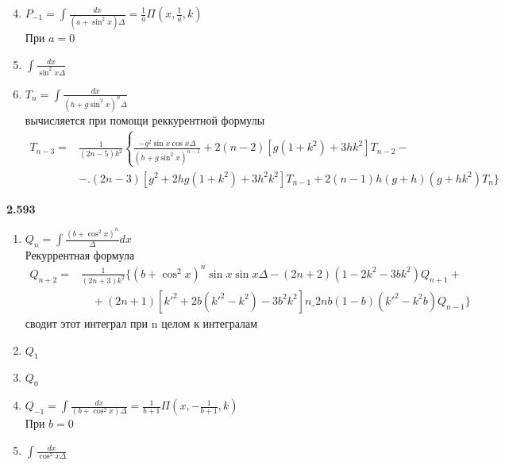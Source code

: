 \documentclass[a4paper,10pt]{article}
\begin{document}
\begin{enumerate}
	\setcounter{enumi}{3}
	\item
		$
			P_{-1} = \displaystyle\int \frac{dx}{(a + \sin^2x) \Delta} = \frac1a \Pi \left(x, \frac1a, k\right)
		$\\[3pt]
		При $a = 0$
	\item
		$
			\displaystyle\int \frac{dx}{\sin^2x\Delta}
		$
		\hfill{}
	\item 
		$
			T_n = \displaystyle\int \frac{dx}{(h + g \sin^2x)^n\Delta}
		$\\[5.5pt]
		вычисляется при помощи реккурентной формулы\\[-7pt]
		
		\qquad $
		\begin{aligned}
			T_{n-3} = & \frac1{(2n - 5)k^2} \left\{ {\frac{-g^2\sin x \cos x \Delta}{(h + g\sin^2 x)^{n-1}} + 2(n-2)\left[ g(1 + k^2) + 3hk^2\right]T_{n-2} - }\right.\\[11pt]
			& - \biggl.(2n-3)\left[ g^2 +2hg(1 + k^2) + 3h^2k^2\right] T_{n-1} + 2(n-1)h(g + h)(g + hk^2)T_n \biggr\}
		\end{aligned}
	$
\end{enumerate}
\vspace{-0.3em}
\hspace{-0.2em}
\textbf{2.593}
\vspace{-0.5em}
\begin{enumerate}
	\item
		$
			Q_n = \displaystyle\int \frac{(b + \cos^2x)^n}\Delta dx
		$\\[6pt]
		Рекуррентная формула\\[-8pt]
		
		\qquad\quad $
		\begin{aligned}
			Q_{n+2} = & \frac1{(2n + 3)k^2} \Biggl\{ (b + \cos^2x)^n \sin x \sin x \Delta - (2n + 2)(1 - 2k^2 -3bk^2) Q_{n+1} + \\[10pt]
			& \quad + (2n + 1) \left[ k'^2 + 2b(k'^2 - k^2) - 3b^2k^2 \right] n \_ 2nb(1 - b)(k'^2 - k^2b) Q_{n-1} \Biggr\}
		\end{aligned}
		$\\[12pt]
		сводит этот интеграл при n целом к интегралам
	\item
		$Q_1$
		\hfill{}
	\item 
		$Q_0$
		\hfill{}
	\item 
		$
			Q_{-1} = \displaystyle\int \frac{dx}{(b + \cos^2 x)\Delta} = \frac1{b + 1}\Pi\left(x, -\frac1{b + 1}, k\right)
		$\\
		При $b = 0$
	\item 
		$
			\displaystyle\int \frac{dx}{\cos^2x\Delta}
		$
		\hfill{}
\end{enumerate}
\end{document}
